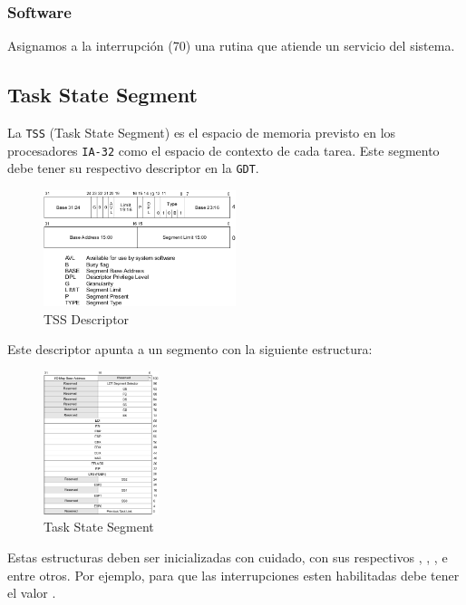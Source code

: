 \subsubsection{Software}
Asignamos a la interrupción  (70) una rutina que atiende un servicio del sistema.

\subsection{Task State Segment}

La \texttt{TSS} (Task State Segment) es el espacio de memoria previsto en los procesadores \texttt{IA-32} como el espacio de contexto de cada tarea. Este segmento debe tener su respectivo descriptor en la \texttt{GDT}. 

\begin{figure}[H]
  \centering
    \includegraphics[width=0.5\textwidth]{images/tss_descriptor}
  \caption{TSS Descriptor}
\end{figure}

Este descriptor apunta a un segmento con la siguiente estructura:

\begin{figure}[H]
  \centering
    \includegraphics[width=0.3\textwidth]{images/tss}
  \caption{Task State Segment}
\end{figure}

Estas estructuras deben ser inicializadas con cuidado, con sus respectivos , , ,  e  entre otros. Por ejemplo, para que las interrupciones esten habilitadas  debe tener el valor .

